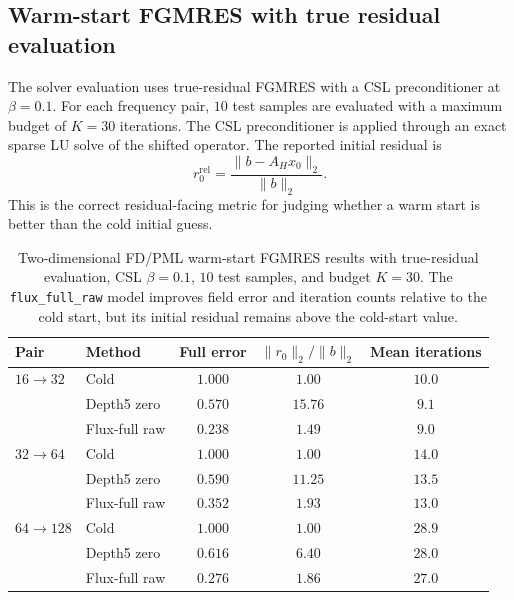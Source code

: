 \subsection{Warm-start FGMRES with true residual evaluation}
\label{subsec:results-2d-solver}

The solver evaluation uses true-residual FGMRES with a CSL preconditioner at
$\beta=0.1$. For each frequency pair, $10$ test samples are evaluated with a
maximum budget of $K=30$ iterations. The CSL preconditioner is applied through
an exact sparse LU solve of the shifted operator. The reported initial
residual is
\begin{equation}
    r_0^{\mathrm{rel}}
    =
    \frac{\|b-A_Hx_0\|_2}{\|b\|_2}.
\end{equation}
This is the correct residual-facing metric for judging whether a warm start is
better than the cold initial guess.

\begin{table}[htbp]
\centering
\caption{Two-dimensional FD/PML warm-start FGMRES results with true-residual
evaluation, CSL $\beta=0.1$, $10$ test samples, and budget $K=30$. The
\texttt{flux\_full\_raw} model improves field error and iteration counts
relative to the cold start, but its initial residual remains above the
cold-start value.}
\label{tab:results-2d-solver}
\begin{tabular}{llccc}
\toprule
Pair & Method & Full error & $\|r_0\|_2/\|b\|_2$ & Mean iterations \\
\midrule
$16\to32$ & Cold & $1.000$ & $1.00$ & $10.0$ \\
          & Depth5 zero & $0.570$ & $15.76$ & $9.1$ \\
          & Flux-full raw & $0.238$ & $1.49$ & $9.0$ \\
\midrule
$32\to64$ & Cold & $1.000$ & $1.00$ & $14.0$ \\
          & Depth5 zero & $0.590$ & $11.25$ & $13.5$ \\
          & Flux-full raw & $0.352$ & $1.93$ & $13.0$ \\
\midrule
$64\to128$ & Cold & $1.000$ & $1.00$ & $28.9$ \\
           & Depth5 zero & $0.616$ & $6.40$ & $28.0$ \\
           & Flux-full raw & $0.276$ & $1.86$ & $27.0$ \\
\bottomrule
\end{tabular}
\end{table}

